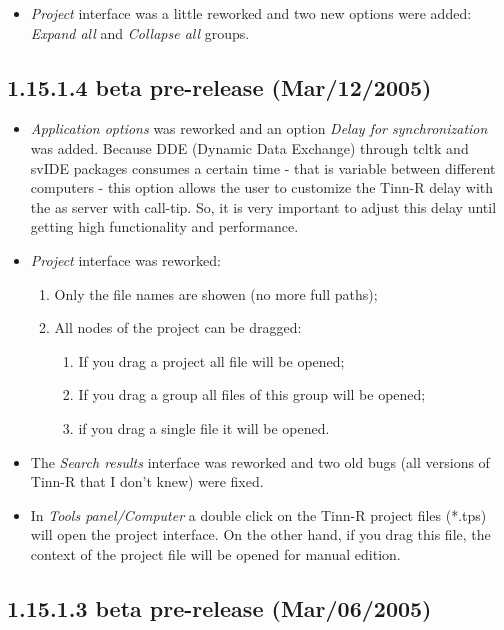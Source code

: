 \begin{itemize}
  \item \textit{Project} interface was a little reworked and two new
    options were added: \textit{Expand all}  and \textit{Collapse all}
    groups.
\end{itemize}


\subsection{1.15.1.4 beta pre-release (Mar/12/2005)}

\begin{itemize}
  \item \textit{Application options} was reworked and an option \textit{Delay for synchronization} was added.
    Because DDE (Dynamic Data Exchange) through tcltk and svIDE packages consumes a certain time - that is
    variable between different computers - this option allows the user to customize the Tinn-R delay with the
    \RR{} as server with call-tip.
    So, it is very important to adjust this delay until getting high functionality and performance.
  \item \textit{Project} interface was reworked:
    \begin{enumerate}
      \item Only the file names are showen (no more full paths);
      \item All nodes of the project can be dragged:
        \begin{enumerate}
          \item If you drag a project all file will be opened;
          \item If you drag a group all files of this group will be opened;
          \item if you drag a single file it will be opened.
        \end{enumerate}
    \end{enumerate}
  \item The \textit{Search results} interface was reworked and two old bugs (all versions of Tinn-R that I don't knew)
    were fixed.
  \item In \textit{Tools panel/Computer} a double click on the Tinn-R project files (*.tps) will open the project
    interface. On the other hand, if you drag this file, the context of the project file will be opened
    for manual edition.
\end{itemize}


\subsection{1.15.1.3 beta pre-release (Mar/06/2005)}

